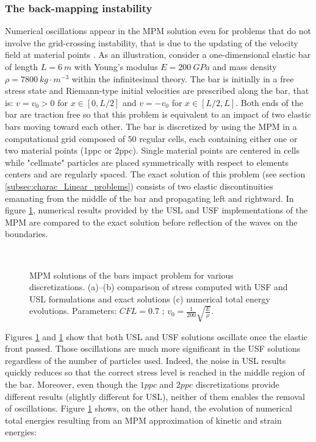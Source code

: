 \subsubsection*{The back-mapping instability}
Numerical oscillations appear in the MPM solution even for problems that do not involve the grid-crossing instability, that is due to the updating of the velocity field at material points \cite{Mass_Flip}. As an illustration, consider a one-dimensional elastic bar of length $L=6\:m$ with Young's modulus $E=200 \:GPa$ and mass density $\rho=7800 \:kg\cdot m^{-3}$ within the infinitesimal theory. The bar is initially in a free stress state and Riemann-type initial velocities are prescribed along the bar, that is: $v=v_0>0$ for $x\in[0,L/2]$ and $v=-v_0$ for $x \in [L/2,L]$. Both ends of the bar are traction free so that this problem is equivalent to an impact of two elastic bars moving toward each other. The bar is discretized by using the MPM in a computational grid composed of $50$ regular cells, each containing either one or two material points (1ppc or 2ppc). Single material points are centered in cells while "cellmate" particles are placed symmetrically with respect to elements centers and are regularly spaced.
The exact solution of this problem (see section \ref{subsec:charac_Linear_problems}) consists of two elastic discontinuities emanating from the middle of the bar and propagating left and rightward. In figure \ref{fig:US_diffusion}, numerical results provided by the USL and USF implementations of the MPM are compared to the exact solution before reflection of the waves on the boundaries. 
\begin{figure}[ht]
  \centering
  {  \label{subfig:US_diffusion_10}}
  {  \label{subfig:US_diffusion_25}}\\
  {  \label{subfig:US_energies}}
  \caption{MPM solutions of the bars impact problem for various discretizations. (a)--(b) comparison of stress computed with USF and USL formulations and exact solutions (c) numerical total energy evolutions. Parameters: $CFL=0.7$ ; $v_0=\frac{1}{200}\sqrt{\frac{E}{\rho}}$.}
  \label{fig:US_diffusion}
\end{figure}
Figures \ref{fig:US_diffusion} and \ref{fig:US_diffusion} show that both USL and USF solutions oscillate once the elastic front passed. Those oscillations are much more significant in the USF solutions regardless of the number of particles used. Indeed, the noise in USL results quickly reduces so that the correct stress level is reached in the middle region of the bar. Moreover, even though the $1ppc$ and $2ppc$ discretizations provide different results (slightly different for USL), neither of them enables the removal of oscillations. Figure \ref{fig:US_diffusion} shows, on the other hand, the evolution of numerical total energies resulting from an MPM approximation of kinetic and strain energies:
